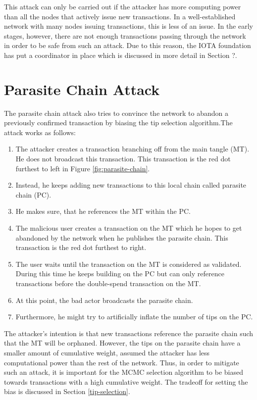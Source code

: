This attack can only be carried out if the attacker has more computing power than all the nodes that actively issue new transactions. In a well-established network with many nodes issuing transactions, this is less of an issue. In the early stages, however, there are not enough transactions passing through the network in order to be safe from such an attack. Due to this reason, the IOTA foundation has put a coordinator in place which is discussed in more detail in Section ?.

\section{Parasite Chain Attack}
The parasite chain attack also tries to convince the network to abandon a previously confirmed transaction by biasing the tip selection algorithm.The attack works as follows:
\begin{enumerate}
    \item The attacker creates a transaction branching off from the main tangle (MT). He does not broadcast this transaction. This transaction is the red dot furthest to left in Figure \ref{fig:parasite-chain}.
    \item Instead, he keeps adding new transactions to this local chain called parasite chain (PC).
    \item He makes sure, that he references the MT within the PC.
    \item The malicious user creates a transaction on the MT which he hopes to get abandoned by the network when he publishes the parasite chain. This transaction is the red dot furthest to right.
    \item The user waits until the transaction on the MT is considered as validated. During this time he keeps building on the PC but can only reference transactions before the double-spend transaction on the MT.
    \item At this point, the bad actor broadcasts the parasite chain.
    \item Furthermore, he might try to artificially inflate the number of tips on the PC.
\end{enumerate}

The attacker's intention is that new transactions reference the parasite chain such that the MT will be orphaned. 
However, the tips on the parasite chain have a smaller amount of cumulative weight, assumed the attacker has less computational power than the rest of the network. 
Thus, in order to mitigate such an attack, it is important for the MCMC selection algorithm to be biased towards transactions with a high cumulative weight. The tradeoff for setting the bias is discussed in Section \ref{tip-selection}.

